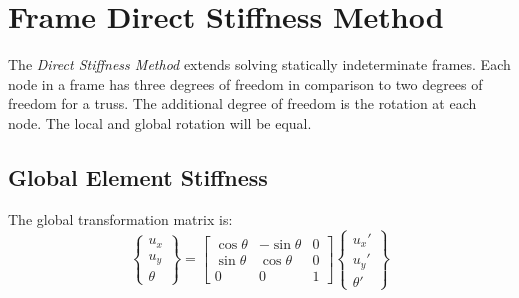 \section{Frame Direct Stiffness Method}
The \textit{Direct Stiffness Method} extends solving statically indeterminate frames. Each node in a frame has three degrees of freedom in comparison to two degrees of freedom for a truss. The additional degree of freedom is the rotation at each node. The local and global rotation will be equal.

\subsection{Global Element Stiffness}

The global transformation matrix is:
\begin{equation}
	\begin{Bmatrix}
		u_x\\ u_y\\ \theta
	\end{Bmatrix}
	=
	\begin{bmatrix}
		\cos\theta & -\sin\theta & 0\\
		\sin\theta & \cos\theta & 0\\
		0 & 0 & 1
	\end{bmatrix}
	\begin{Bmatrix}
		u_x'\\ u_y'\\ \theta'
	\end{Bmatrix}
\end{equation}